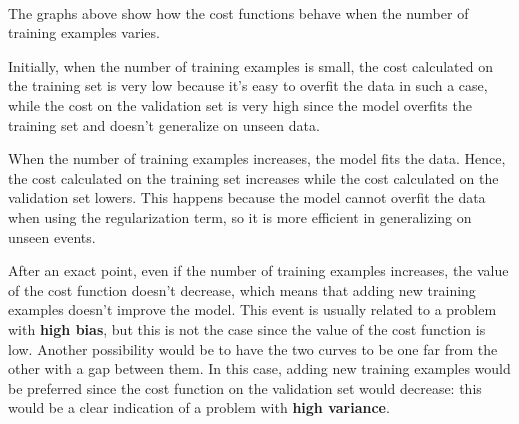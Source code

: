 \documentclass[11pt]{article}
\begin{document}
    \begin{center}
    \end{center}
    { \hspace*{\fill} \\}
    
The graphs above show how the cost functions behave when the number of training examples varies.

Initially, when the number of training examples is small, the cost calculated on the training set is very low because it’s easy to overfit the data in such a case, while the cost on the validation set is very high since the model overfits the training set and doesn’t generalize on unseen data.

When the number of training examples increases, the model fits the data. Hence, the cost calculated on the training set increases while the cost calculated on the validation set lowers. This happens because the model cannot overfit the data when using the regularization term, so it is more efficient in generalizing on unseen events.

After an exact point, even if the number of training examples increases,
the value of the cost function doesn't decrease, which means that adding
new training examples doesn't improve the model. This event is usually
related to a problem with \textbf{high bias}, but this is not the case
since the value of the cost function is low. Another possibility would be to have the two curves to be one far from the other with a gap between them. In this case, adding new training examples would be preferred since the cost function on the validation set would decrease: this would be a clear indication of a problem with \textbf{high variance}.


    
    
    
    
\end{document}
